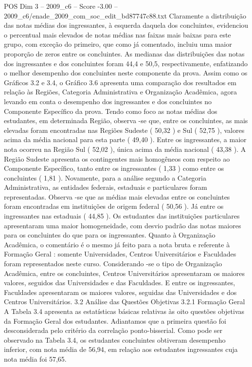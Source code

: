 \begin{textsample}{POS Dim 3 – 2009\_c6 – Score -3.00 – 2009\_c6/enade\_2009\_com\_soc\_edit\_bd87747c88.txt}
Claramente a distribuição das notas médias dos ingressantes, à esquerda daquela dos concluintes, evidenciou o percentual mais elevados de notas médias nas faixas mais baixas para este grupo, com exceção do primeiro, que como já comentado, incluiu uma maior proporção de zeros entre os concluintes.
As medianas das distribuições das notas dos ingressantes e dos concluintes foram 44,4 e 50,5, respectivamente, enfatizando o melhor desempenho dos concluintes neste componente da prova.
Assim como os Gráficos 3.2 e 3.4, o Gráfico 3.6 apresenta uma comparação dos resultados em relação às Regiões, Categoria Administrativa e Organização Acadêmica, agora levando em conta o desempenho dos ingressantes e dos concluintes no Componente Específico da prova.
Tendo como foco as notas médias dos estudantes, em determinada Região, observa -se que, entre os concluintes, as mais elevadas foram encontradas nas Regiões Sudeste ( 50,32 ) e Sul ( 52,75 ), valores acima da média nacional para esta parte ( 49,40 ).
Entre os ingressantes, a maior nota ocorreu na Região Sul ( 52,02 ), única acima da média nacional ( 43,38 ).
A Região Sudeste apresenta os contingentes mais homogêneos com respeito ao Componente Específico, tanto entre os ingressantes ( 1,33 ) como entre os concluintes ( 1,81 ).
Novamente, para a análise segundo a Categoria Administrativa, as entidades federais, estaduais e particulares foram representadas.
Observa -se que as médias mais elevadas entre os concluintes foram encontradas em instituições de origem federal ( 50,56 ).
Já entre os ingressantes nas estaduais ( 44,85 ).
Os estudantes das instituições particulares apresentaram uma maior homogeneidade, com desvio padrão das notas maiores para os concluintes do que para os ingressantes.
Quanto à Organização Acadêmica, o comentário é o mesmo já feito para a nota bruta e referente à Formação Geral : somente Universidades, Centros Universitários e Faculdades foram representados neste curso.
Considerando -se o tipo de Organização Acadêmica, entre os concluintes, Centros Universitários apresentaram os maiores valores, seguidos das Universidades e das Faculdades.
E entre os ingressantes, Faculdades apresentaram os maiores valores, seguidas das Universidades e dos Centros Universitários. 3.2 Análise das Questões Objetivas 3.2.1 Formação Geral A Tabela 3.4 apresenta as estatísticas básicas relativas às oito questões objetivas da Formação Geral dos estudantes.
Adiantamos que a primeira questão foi desconsiderada pelo critério da correlação ponto-bisserial.
Como pode ser observado na Tabela 3.4, os estudantes concluintes obtiveram desempenho inferior, com nota média de 56,94, em relação aos estudantes ingressantes cuja nota média foi 57,65.

\end{textsample}
